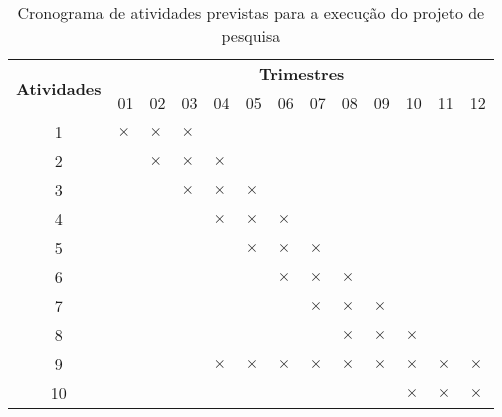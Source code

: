 \documentclass[a4paper,12pt]{article}
\begin{document}
\begin{table}[htbp]
\small
\caption{Cronograma de atividades previstas para a execução do projeto de pesquisa} %
\begin{center}
\begin{tabular}{c|llllllllllll}
\toprule
\multicolumn{1}{c|}{\multirow{2}{*}{\textbf{Atividades}}} & \multicolumn{12}{c}{\textbf{Trimestres}} \\ 
\multicolumn{1}{c|}{} & 01 & 02 & 03 & 04 & 05 & 06 & 07 & 08 & 09 & 10 & 11 & 12 \\ \midrule
1 & $\times$ & $\times$ & $\times$ & ~ & ~ & ~ & ~ & ~ & ~ & ~ & ~ & ~ \\ \midrule
2 & ~ & $\times$ & $\times$ & $\times$ & ~ & ~ & ~ & ~ & ~ & ~ & ~ & ~ \\ \midrule
3 & ~ & ~ & $\times$ & $\times$ & $\times$ & ~ & ~ & ~ & ~ & ~ & ~ & ~ \\ \midrule
4 & ~ & ~ & ~ & $\times$ & $\times$ & $\times$ & ~ & ~ & ~ & ~ & ~ & ~ \\ \midrule
5 & ~ & ~ & ~ & ~ & $\times$ & $\times$ & $\times$ & ~ & ~ & ~ & ~ & ~ \\ \midrule
6 & ~ & ~ & ~ & ~ & ~ & $\times$ & $\times$ & $\times$ & ~ & ~ & ~ & ~ \\ \midrule
7 & ~ & ~ & ~ & ~ & ~ & ~ & $\times$ & $\times$ & $\times$ & ~ & ~ & ~ \\ \midrule
8 & ~ & ~ & ~ & ~ & ~ & ~ & ~ & $\times$ & $\times$ & $\times$ & ~ & ~ \\ \midrule
9 & ~ & ~ & ~ & $\times$ & $\times$ & $\times$ & $\times$ & $\times$ & $\times$ & $\times$ & $\times$ & $\times$ \\ \midrule
10 & ~ & ~ & ~ & ~ & ~ & ~ & ~ & ~ & ~ & $\times$ & $\times$ & $\times$ \\ \bottomrule
\end{tabular}
\end{center}
\label{cronograma} %
\end{table}
\end{document}
